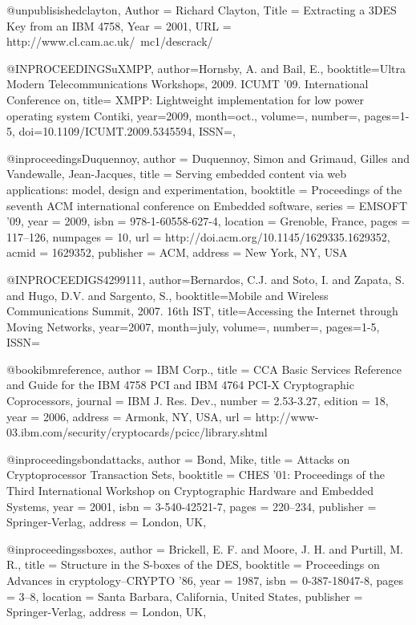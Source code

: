 @unpublisished{clayton,
	Author = {Richard Clayton},
	Title = {Extracting a 3DES Key from an IBM 4758},
	Year = {2001},
	URL = {http://www.cl.cam.ac.uk/~mc1/descrack/}
}

@INPROCEEDINGS{uXMPP, 
author={Hornsby, A. and Bail, E.}, 
booktitle={Ultra Modern Telecommunications Workshops, 2009. ICUMT '09. International Conference on}, title={ \mu XMPP: Lightweight implementation for low power operating system Contiki}, 
year={2009}, 
month={oct.}, 
volume={}, 
number={}, 
pages={1-5}, 
doi={10.1109/ICUMT.2009.5345594}, 
ISSN={},}

@inproceedings{Duquennoy,
 author = {Duquennoy, Simon and Grimaud, Gilles and Vandewalle, Jean-Jacques},
 title = {Serving embedded content via web applications: model, design and experimentation},
 booktitle = {Proceedings of the seventh ACM international conference on Embedded software},
 series = {EMSOFT '09},
 year = {2009},
 isbn = {978-1-60558-627-4},
 location = {Grenoble, France},
 pages = {117--126},
 numpages = {10},
 url = {http://doi.acm.org/10.1145/1629335.1629352},
 acmid = {1629352},
 publisher = {ACM},
 address = {New York, NY, USA}} 
 
@INPROCEEDIGS{4299111, 
author={Bernardos, C.J. and Soto, I. and Zapata, S. and Hugo, D.V. and Sargento, S.}, 
booktitle={Mobile and Wireless Communications Summit, 2007. 16th IST}, title={Accessing the Internet through Moving Networks}, 
year={2007}, 
month={july}, 
volume={}, 
number={}, 
pages={1-5}, 
ISSN={}}

@book{ibmreference,
 author = {IBM Corp.},
 title = {CCA Basic Services Reference and Guide for the IBM 4758 PCI and IBM 4764 PCI-X Cryptographic Coprocessors},
 journal = {IBM J. Res. Dev.},
 number = {2.53-3.27},
 edition = {18},
 year = {2006},
 address = {Armonk, NY, USA},
 url = {http://www-03.ibm.com/security/cryptocards/pcicc/library.shtml}
 }
 


@inproceedings{bondattacks,
 author = {Bond, Mike},
 title = {Attacks on Cryptoprocessor Transaction Sets},
 booktitle = {CHES '01: Proceedings of the Third International Workshop on Cryptographic Hardware and Embedded Systems},
 year = {2001},
 isbn = {3-540-42521-7},
 pages = {220--234},
 publisher = {Springer-Verlag},
 address = {London, UK},
 }

@inproceedings{sboxes,
 author = {Brickell, E. F. and Moore, J. H. and Purtill, M. R.},
 title = {Structure in the S-boxes of the DES},
 booktitle = {Proceedings on Advances in cryptology--CRYPTO '86},
 year = {1987},
 isbn = {0-387-18047-8},
 pages = {3--8},
 location = {Santa Barbara, California, United States},
 publisher = {Springer-Verlag},
 address = {London, UK},
 }
 
